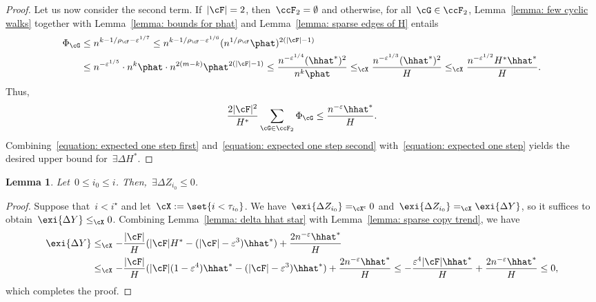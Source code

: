 \documentclass[11pt]{amsart}
\newcommand{\eps}{\varepsilon}
\DeclarePairedDelimiter{\abs}{\lvert}{\rvert}
\newcommand{\Xleq}{\leq_{\cX}}
\newcommand{\Xeq}{=_{\cX}}
\newcommand{\comp}{{\mathsf{c}}}
\newtheorem{lemma}[algocf]{Lemma}
\theoremstyle{definition}
\numberwithin{equation}{section}
\begin{document}
\begin{proof}
		Let us now consider the second term.
		If~$\abs{\cF}=2$, then~$\ccF_2=\emptyset$ and otherwise, for all~$\cG\in\ccF_2$,
		Lemma~\ref{lemma: few cyclic walks} together with Lemma~\ref{lemma: bounds for phat} and Lemma~\ref{lemma: sparse edges of H} entails
		\begin{equation*}
			\begin{aligned}
				\Phi_{\cG}
				&\leq n^{k-1/\rho_\cF-\eps^{1/7}}
				\leq n^{k-1/\rho_\cF-\eps^{1/6}}(n^{1/\rho_\cF}\phat)^{2(\abs{\cF}-1)}\\
				&\leq n^{-\eps^{1/5}}\cdot n^k\phat\cdot n^{2(m-k)}\phat^{2(\abs{\cF}-1)}
				\leq \frac{n^{-\eps^{1/4}} (\hhat^*)^2 }{n^k\phat}
				\Xleq \frac{n^{-\eps^{1/3}} (\hhat^*)^2 }{H}
				\Xleq \frac{n^{-\eps^{1/2}} H^*\hhat^* }{H}.
			\end{aligned}
		\end{equation*}
		Thus,
		\begin{equation}\label{equation: expected one step second}
			\frac{2\abs{\cF}^2}{H^*}\sum_{\cG\in\ccF_2 } \Phi_{\cG}
			\leq \frac{n^{-\eps}\hhat^*}{H}.
		\end{equation}
		Combining~\eqref{equation: expected one step first} and~\eqref{equation: expected one step second} with~\eqref{equation: expected one step} yields the desired upper bound for~$\exi{\Delta H^*}$.
	\end{proof}
		
	\begin{lemma}\label{lemma: copy deviation is supermartingale}
		Let~$0\leq i_0\leq i$.
		Then,~$\exi{\Delta Z_{i_0}}\leq 0$.
	\end{lemma}
	\begin{proof}
		Suppose that~$i< i^\star$ and let~$\cX:=\set{ i<\tau_{i_0} }$.
		We have~$\exi{\Delta Z_{i_0}}=_{\cX^\comp}0$ and~$\exi{\Delta Z_{i_0}}\Xeq \exi{\Delta Y}$, so it suffices to obtain~$\exi{\Delta Y}\Xleq 0$.
		Combining Lemma~\ref{lemma: delta hhat star} with Lemma~\ref{lemma: sparse copy trend}, we have
		\begin{equation*}
			\begin{aligned}
				\exi{\Delta Y}
				&\Xleq -\frac{\abs{\cF}}{H}(\abs{\cF}H^*-(\abs{\cF}-\eps^3)\hhat^*)+\frac{2n^{-\eps}\hhat^*}{H}\\
				&\Xleq -\frac{\abs{\cF}}{H}(\abs{\cF}(1-\eps^4)\hhat^*-(\abs{\cF}-\eps^3)\hhat^*)+\frac{2n^{-\eps}\hhat^*}{H}
				\leq -\frac{\eps^4\abs{\cF}\hhat^*}{H}+\frac{2n^{-\eps}\hhat^*}{H}
				\leq 0,
			\end{aligned}
		\end{equation*}
		which completes the proof.
	\end{proof}
\end{document}
